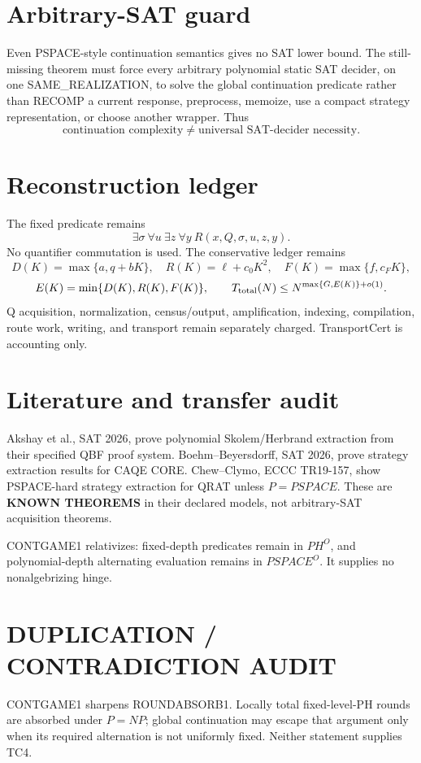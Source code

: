 \documentclass{article}
\begin{document}
\section*{Arbitrary-SAT guard}
Even PSPACE-style continuation semantics gives no SAT lower bound. The still-missing theorem must force every arbitrary polynomial static SAT decider, on one SAME_REALIZATION, to solve the global continuation predicate rather than RECOMP a current response, preprocess, memoize, use a compact strategy representation, or choose another wrapper. Thus
\[
\boxed{\text{continuation complexity}\ne\text{universal SAT-decider necessity}.}
\]

\section*{Reconstruction ledger}
The fixed predicate remains
\[
\exists\sigma\ \forall u\ \exists z\ \forall y\ R(x,Q,\sigma,u,z,y).
\]
No quantifier commutation is used. The conservative ledger remains
\[
D(K)=\max\{a,q+bK\},\quad R(K)=\ell+c_0K^2,\quad F(K)=\max\{f,c_FK\},
\]
\[
E(K)=\min\{D(K),R(K),F(K)\},\qquad
T_{\rm total}(N)\le N^{\max\{G,E(K)\}+o(1)}.
\]
Q acquisition, normalization, census/output, amplification, indexing, compilation, route work, writing, and transport remain separately charged. TransportCert is accounting only.

\section*{Literature and transfer audit}
Akshay et al., SAT 2026, prove polynomial Skolem/Herbrand extraction from their specified QBF proof system. Boehm--Beyersdorff, SAT 2026, prove strategy extraction results for CAQE CORE. Chew--Clymo, ECCC TR19-157, show PSPACE-hard strategy extraction for QRAT unless \(P=PSPACE\). These are \textbf{KNOWN THEOREMS} in their declared models, not arbitrary-SAT acquisition theorems.

CONTGAME1 relativizes: fixed-depth predicates remain in \(PH^O\), and polynomial-depth alternating evaluation remains in \(PSPACE^O\). It supplies no nonalgebrizing hinge.

\section*{DUPLICATION / CONTRADICTION AUDIT}
CONTGAME1 sharpens ROUNDABSORB1. Locally total fixed-level-PH rounds are absorbed under \(P=NP\); global continuation may escape that argument only when its required alternation is not uniformly fixed. Neither statement supplies TC4.
\end{document}
